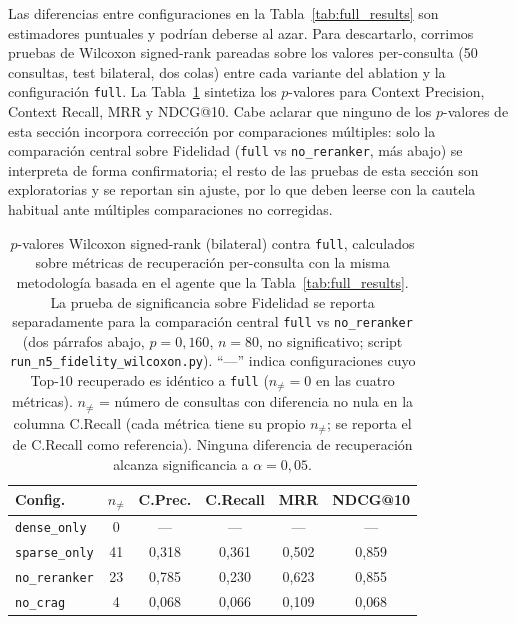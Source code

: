 \documentclass[runningheads]{llncs}
\begin{document}
Las diferencias entre configuraciones en la Tabla~\ref{tab:full_results} son estimadores puntuales y podr\'{i}an deberse al azar. Para descartarlo, corrimos pruebas de Wilcoxon signed-rank pareadas sobre los valores per-consulta (50 consultas, test bilateral, dos colas) entre cada variante del ablation y la configuraci\'{o}n \texttt{full}. La Tabla~\ref{tab:wilcoxon} sintetiza los $p$-valores para Context Precision, Context Recall, MRR y NDCG@10. Cabe aclarar que ninguno de los $p$-valores de esta secci\'{o}n incorpora correcci\'{o}n por comparaciones m\'{u}ltiples: solo la comparaci\'{o}n central sobre Fidelidad (\texttt{full} vs \texttt{no\_reranker}, m\'{a}s abajo) se interpreta de forma confirmatoria; el resto de las pruebas de esta secci\'{o}n son exploratorias y se reportan sin ajuste, por lo que deben leerse con la cautela habitual ante m\'{u}ltiples comparaciones no corregidas.

\begin{table}[!ht]
\centering
\caption{$p$-valores Wilcoxon signed-rank (bilateral) contra \texttt{full}, calculados sobre m\'{e}tricas de recuperaci\'{o}n per-consulta con la misma metodolog\'{i}a basada en el agente que la Tabla~\ref{tab:full_results}. La prueba de significancia sobre Fidelidad se reporta separadamente para la comparaci\'{o}n central \texttt{full} vs \texttt{no\_reranker} (dos p\'{a}rrafos abajo, $p{=}0{,}160$, $n{=}80$, no significativo; script \texttt{run\_n5\_fidelity\_wilcoxon.py}). ``---'' indica configuraciones cuyo Top-10 recuperado es id\'{e}ntico a \texttt{full} ($n_{\neq}{=}0$ en las cuatro m\'{e}tricas). $n_{\neq}$ = n\'{u}mero de consultas con diferencia no nula en la columna C.Recall (cada m\'{e}trica tiene su propio $n_{\neq}$; se reporta el de C.Recall como referencia). Ninguna diferencia de recuperaci\'{o}n alcanza significancia a $\alpha{=}0{,}05$.}
\label{tab:wilcoxon}
\footnotesize
\begin{tabular}{l c c c c c}
\toprule
\textbf{Config.} & \textbf{$n_{\neq}$} & \textbf{C.Prec.} & \textbf{C.Recall} & \textbf{MRR} & \textbf{NDCG@10} \\
\midrule
\texttt{dense\_only}    &  0 & --- & --- & --- & --- \\
\texttt{sparse\_only}   & 41 & 0{,}318 & 0{,}361 & 0{,}502 & 0{,}859 \\
\texttt{no\_reranker}   & 23 & 0{,}785 & 0{,}230 & 0{,}623 & 0{,}855 \\
\texttt{no\_crag}       &  4 & 0{,}068 & 0{,}066 & 0{,}109 & 0{,}068 \\
\bottomrule
\end{tabular}
\end{table}
\end{document}
